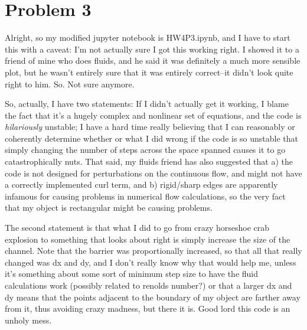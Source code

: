 \documentclass[11pt,letterpaper]{article}
\begin{document}
\section*{Problem 3}
Alright, so my modified jupyter notebook is HW4P3.ipynb, and I have to start this with a caveat: I'm not actually sure I got this working right. I showed it to a friend of mine who does fluids, and he said it was definitely a much more sensible plot, but he wasn't entirely sure that it was entirely correct--it didn't look quite right to him. So. Not sure anymore. 

So, actually, I have two statements: If I didn't actually get it working, I blame the fact that it's a hugely complex and nonlinear set of equations, and the code is \textit{hilariously} unstable; I have a hard time really believing that I can reasonably or coherently determine whether or what I did wrong if the code is so unstable that simply changing the number of steps across the space spanned causes it to go catastrophically nuts. That said, my fluids friend has also suggested that a) the code is not designed for perturbations on the continuous flow, and might not have a correctly implemented curl term, and b) rigid/sharp edges are apparently infamous for causing problems in numerical flow calculations, so the very fact that my object is rectangular might be causing problems. 

The second statement is that what I did to go from crazy horseshoe crab explosion to something that looks about right is simply increase the size of the channel. Note that the barrier was proportionally increased, so that all that really changed was dx and dy, and I don't really know why that would help me, unless it's something about some sort of minimum step size to have the fluid calculations work (possibly related to renolds number?) or that a larger dx and dy means that the points adjacent to the boundary of my object are farther away from it, thus avoiding crazy madness, but there it is. 
Good lord this code is an unholy mess. 
\end{document}
